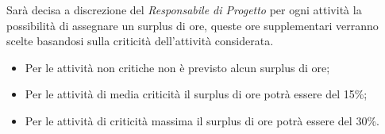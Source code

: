 Sarà decisa a discrezione del \textit{Responsabile di Progetto} per ogni attività la possibilità di assegnare un surplus di ore, queste ore supplementari verranno scelte basandosi sulla criticità dell'attività considerata.

\begin{itemize}
\item Per le attività non critiche non è previsto alcun surplus di ore;
\item Per le attività di media criticità il surplus di ore potrà essere del 15\%;
\item Per le attività di criticità massima il surplus di ore potrà essere del 30\%.
\end{itemize}
